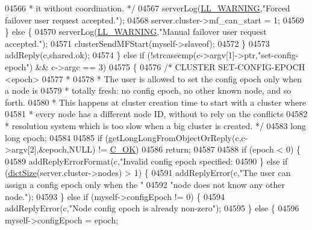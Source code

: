 \begin{DoxyCode}
{{{{{{{{{{{{{{{{{{{{{{{{{{{{{{{{{{{{{{{{{{{{{{{{{{{{{{{{{{{{{{{{{{{{{{{{{{{{{{{{{{{{{{{{{{{{{{{{{{{{{{{{04566 \textcolor{comment}{             * it without coordination. */}
04567             serverLog(\hyperlink{server_8h_a31229b9334bba7d6be2a72970967a14b}{LL\_WARNING},\textcolor{stringliteral}{"Forced failover user request accepted."});
04568             server.cluster->mf\_can\_start = 1;
04569         \} \textcolor{keywordflow}{else} \{
04570             serverLog(\hyperlink{server_8h_a31229b9334bba7d6be2a72970967a14b}{LL\_WARNING},\textcolor{stringliteral}{"Manual failover user request accepted."});
04571             clusterSendMFStart(myself->slaveof);
04572         \}
04573         addReply(c,shared.ok);
04574     \} \textcolor{keywordflow}{else} \textcolor{keywordflow}{if} (!strcasecmp(c->argv[1]->ptr,\textcolor{stringliteral}{"set-config-epoch"}) && c->argc == 3)
04575     \{
04576         \textcolor{comment}{/* CLUSTER SET-CONFIG-EPOCH <epoch>}
04577 \textcolor{comment}{         *}
04578 \textcolor{comment}{         * The user is allowed to set the config epoch only when a node is}
04579 \textcolor{comment}{         * totally fresh: no config epoch, no other known node, and so forth.}
04580 \textcolor{comment}{         * This happens at cluster creation time to start with a cluster where}
04581 \textcolor{comment}{         * every node has a different node ID, without to rely on the conflicts}
04582 \textcolor{comment}{         * resolution system which is too slow when a big cluster is created. */}
04583         \textcolor{keywordtype}{long} \textcolor{keywordtype}{long} epoch;
04584 
04585         \textcolor{keywordflow}{if} (getLongLongFromObjectOrReply(c,c->argv[2],&epoch,NULL) != \hyperlink{server_8h_a303769ef1065076e68731584e758d3e1}{C\_OK})
04586             \textcolor{keywordflow}{return};
04587 
04588         \textcolor{keywordflow}{if} (epoch < 0) \{
04589             addReplyErrorFormat(c,\textcolor{stringliteral}{"Invalid config epoch specified: %
04590         \} \textcolor{keywordflow}{else} \textcolor{keywordflow}{if} (\hyperlink{dict_8h_af193430dd3d5579a52b194512f72c1f0}{dictSize}(server.cluster->nodes) > 1) \{
04591             addReplyError(c,\textcolor{stringliteral}{"The user can assign a config epoch only when the "}
04592                             \textcolor{stringliteral}{"node does not know any other node."});
04593         \} \textcolor{keywordflow}{else} \textcolor{keywordflow}{if} (myself->configEpoch != 0) \{
04594             addReplyError(c,\textcolor{stringliteral}{"Node config epoch is already non-zero"});
04595         \} \textcolor{keywordflow}{else} \{
04596             myself->configEpoch = epoch;
}}}}}}}}}}}}}}}}}}}}}}}}}}}}}}}}}}}}}}}}}}}}}}}}}}}}}}}}}}}}}}}}}}}}}}}}}}}}}}}}}}}}}}}}}}}}}}}}}}}}}}}}}
\end{DoxyCode}
